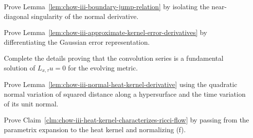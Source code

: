 \begin{claim}
\label{clm:chow-iii-boundary-jump-exercise}
Prove Lemma~\ref{lem:chow-iii-boundary-jump-relation} by isolating the
near-diagonal singularity of the normal derivative.
\end{claim}

\begin{claim}
\label{clm:chow-iii-error-derivative-exercise}
Prove Lemma~\ref{lem:chow-iii-approximate-kernel-error-derivatives} by
differentiating the Gaussian error representation.
\end{claim}

\begin{claim}
\label{clm:chow-iii-fundamental-solution-exercise}
Complete the details proving that the convolution series is a fundamental
solution of \(L_{x,\tau}u=0\) for the evolving metric.
\end{claim}

\begin{claim}
\label{clm:chow-iii-normal-derivative-exercise}
Prove Lemma~\ref{lem:chow-iii-normal-heat-kernel-derivative} using the
quadratic normal variation of squared distance along a hypersurface and the
time variation of its unit normal.
\end{claim}

\begin{claim}
\label{clm:chow-iii-prove-ricci-flow-characterization}
Prove Claim~\ref{clm:chow-iii-heat-kernel-characterizes-ricci-flow} by
passing from the parametrix expansion to the heat kernel and normalizing (f).
\end{claim}
